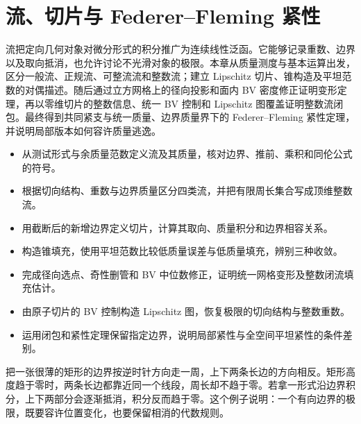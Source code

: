 
% 
% 

\chapter{流、切片与 Federer–Fleming 紧性}
\label{g3:ch:22}

\begin{chapterabstract}
	流把定向几何对象对微分形式的积分推广为连续线性泛函。它能够记录重数、边界以及取向抵消，也允许讨论不光滑对象的极限。本章从质量测度与基本运算出发，区分一般流、正规流、可整流流和整数流；建立 Lipschitz 切片、锥构造及平坦范数的对偶描述。随后通过立方网格上的径向投影和面内 BV 密度修正证明变形定理，再以零维切片的整数信息、统一 BV 控制和 Lipschitz 图覆盖证明整数流闭包。最终得到共同紧支与统一质量、边界质量界下的 Federer--Fleming 紧性定理，并说明局部版本如何容许质量逃逸。
\end{chapterabstract}

\begin{learninggoals}
	\begin{itemize}
		\item 从测试形式与余质量范数定义流及其质量，核对边界、推前、乘积和同伦公式的符号。
		\item 根据切向结构、重数与边界质量区分四类流，并把有限周长集合写成顶维整数流。
		\item 用截断后的新增边界定义切片，计算其取向、质量积分和边界相容关系。
		\item 构造锥填充，使用平坦范数比较低质量误差与低质量填充，辨别三种收敛。
		\item 完成径向选点、奇性删管和 BV 中位数修正，证明统一网格变形及整数闭流填充估计。
		\item 由原子切片的 BV 控制构造 Lipschitz 图，恢复极限的切向结构与整数重数。
		\item 运用闭包和紧性定理保留指定边界，说明局部紧性与全空间平坦紧性的条件差别。
	\end{itemize}
\end{learninggoals}

把一张很薄的矩形的边界按逆时针方向走一周，上下两条长边的方向相反。矩形高度趋于零时，两条长边都靠近同一个线段，周长却不趋于零。若拿一形式沿边界积分，上下两部分会逐渐抵消，积分反而趋于零。这个例子说明：一个有向边界的极限，既要容许位置变化，也要保留相消的代数规则。

